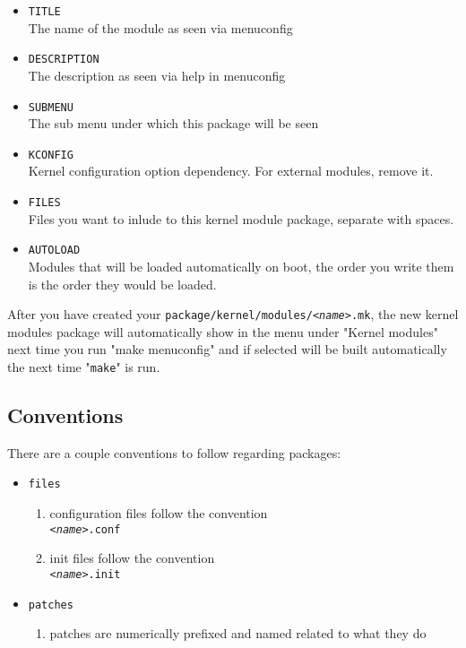 \begin{itemize}
    \item \texttt{TITLE} \\
        The name of the module as seen via menuconfig
    \item \texttt{DESCRIPTION} \\
        The description as seen via help in menuconfig
    \item \texttt{SUBMENU} \\
        The sub menu under which this package will be seen
    \item \texttt{KCONFIG} \\
        Kernel configuration option dependency. For external modules, remove it.
    \item \texttt{FILES} \\
        Files you want to inlude to this kernel module package, separate with spaces.
    \item \texttt{AUTOLOAD} \\
        Modules that will be loaded automatically on boot, the order you write them is the order they would be loaded.
\end{itemize}

After you have created your \texttt{package/kernel/modules/\textit{<name>}.mk}, the new kernel modules package
will automatically show in the menu under "Kernel modules" next time you run "make menuconfig" and if selected
will be built automatically the next time "\texttt{make}" is run.

\subsection{Conventions}

There are a couple conventions to follow regarding packages:

\begin{itemize}
    \item \texttt{files}
    \begin{enumerate}
        \item configuration files follow the convention \\
        \texttt{\textit{<name>}.conf}
        \item init files follow the convention \\
        \texttt{\textit{<name>}.init}
    \end{enumerate}
    \item \texttt{patches}
    \begin{enumerate}
        \item patches are numerically prefixed and named related to what they do
    \end{enumerate}
\end{itemize}

